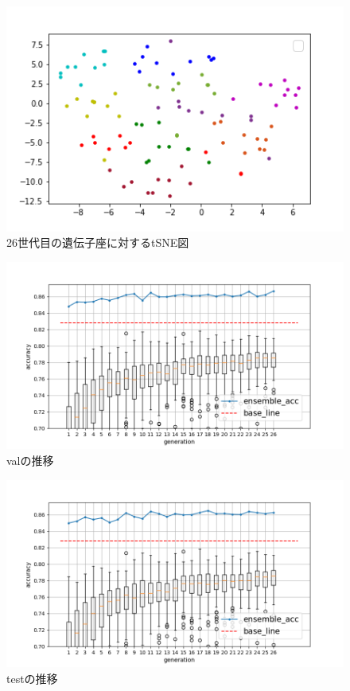 \documentclass[twocolumn]{jarticle}     %
\begin{document}

\begin{figure}[h]
	\centering
	\includegraphics[scale=0.7]{graph3.png}
	\caption{26世代目の遺伝子座に対するtSNE図\label{fig:graph3}}
\end{figure}



\begin{figure}[hp]
	\centering
	\includegraphics[scale=0.7]{graph1.png}
	\caption{valの推移\label{fig:graph}}
\end{figure}

\begin{figure}[hp]
	\centering
	\includegraphics[scale=0.7]{graph2.png}
	\caption{testの推移\label{fig:graph2}}
\end{figure}
\end{document}
